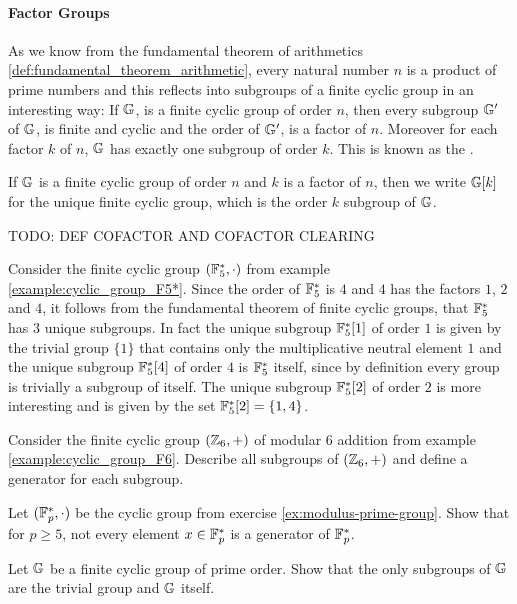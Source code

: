 \paragraph{Factor Groups}
As we know from the fundamental theorem of arithmetics \ref{def:fundamental_theorem_arithmetic}, every natural number $n$ is a product of prime numbers and this reflects into subgroups of a finite cyclic group in an interesting way: If $\mathbb{G}$, is a finite cyclic group of order $n$, then every subgroup $\mathbb{G}'$ of $\mathbb{G}$, is finite and cyclic and the order of $\mathbb{G}'$, is a factor of $n$. Moreover for each factor $k$ of $n$, $\mathbb{G}$ has exactly one subgroup of order $k$. This is known as the \label{def:fundamental_theorem_arithmetic}.
\begin{notation}If $\mathbb{G}$ is a finite cyclic group of order $n$ and $k$ is a factor of $n$, then we write $\mathbb{G}[k]$ for the unique finite cyclic group, which is the order $k$ subgroup of $\mathbb{G}$.
\end{notation}
TODO: DEF COFACTOR AND COFACTOR CLEARING

\begin{example} Consider the finite cyclic group $(\mathbb{F}_5^*,\cdot)$ from example \ref{example:cyclic_group_F5*}. Since the order of $\mathbb{F}^*_5$ is $4$ and $4$ has the factors $1$, $2$ and $4$, it follows from the fundamental theorem of finite cyclic groups, that $\mathbb{F}^*_5$ has $3$ unique subgroups. In fact the unique subgroup $\mathbb{F}^*_5[1]$ of order $1$ is given by the trivial group $\{1\}$ that contains only the multiplicative neutral element $1$ and the unique subgroup $\mathbb{F}^*_5[4]$ of order $4$ is $\mathbb{F}^*_5$ itself, since by definition every group is trivially a subgroup of itself. The unique subgroup $\mathbb{F}^*_5[2]$ of order $2$ is more interesting and is given by the set $\mathbb{F}^*_5[2]=\{1,4\}$.
\end{example}
\begin{exercise}
Consider the finite cyclic group $(\mathbb{Z}_6,+)$ of modular 6 addition from example \ref{example:cyclic_group_F6}. Describe all subgroups of $(\mathbb{Z}_6,+)$ and define a generator for each subgroup.
\end{exercise}
\begin{exercise}Let $(\mathbb{F}_p^*,\cdot)$ be the cyclic group from exercise \ref{ex:modulus-prime-group}. Show that for $p\geq 5$, not every element $x\in \mathbb{F}_p^*$ is a generator of $\mathbb{F}_p^*$.
\end{exercise}
\begin{exercise}Let $\mathbb{G}$ be a finite cyclic group of prime order. Show that the only subgroups of $\mathbb{G}$ are the trivial group and $\mathbb{G}$ itself.
\end{exercise}
